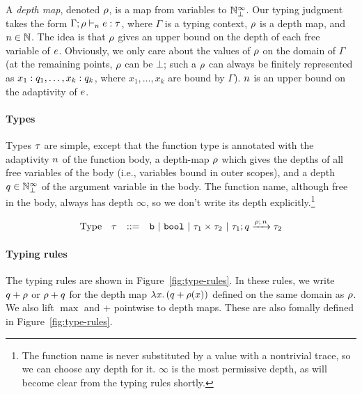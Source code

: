 \documentclass[a4paper,11pt]{article}
\theoremstyle{definition}
\begin{document}
A \emph{depth map}, denoted $\rho$, is a map from variables to
$\mathbb{N}_{\bot}^\infty$.
%
%
Our typing judgment takes the form $\Gamma; \rho \vdash_{n}
e: \tau$, where $\Gamma$ is a typing context, $\rho$ is a depth
map, and $n \in \mathbb{N}$. The idea is that $\rho$ gives an upper
bound on the depth of each free variable of $e$. Obviously, we
only care about the values of $\rho$ on the domain of $\Gamma$ (at
the remaining points, $\rho$ can be $\bot$; such a $\rho$ can always
be finitely represented as $x_1: q_1, \ldots, x_k: q_k$,
where $x_1,\ldots,x_k$ are bound by $\Gamma$). $n$ is an upper
bound on the adaptivity of $e$.

\paragraph{Types}
Types $\tau$ are simple, except that the function type is annotated
with the adaptivity $n$ of the function body, a depth-map $\rho$
which gives the depths of all free variables of the body (i.e.,
variables bound in outer scopes), and a depth $q \in \mathbb{N}_{\bot}^\infty$ of
the argument variable in the body. The function name, although free in
the body, always has depth $\infty$, so we don't write its depth
explicitly.\footnote{The function name is never substituted by a value
  with a nontrivial trace, so we can choose any depth for it. $\infty$
  is the most permissive depth, as will become clear from the typing
  rules shortly.}

\[
\begin{array}{llll}
  \mbox{Type} & \tau & ::= & \mathtt{b} ~|~ \mathtt{bool} ~|~ \tau_1 \times
  \tau_2 ~|~ \tau_1; q \xrightarrow{\rho; \, n} \tau_2
\end{array}
\]


\paragraph{Typing rules}
The typing rules are shown in Figure~\ref{fig:type-rules}. In these
rules, we write $q + \rho$ or $\rho + q$ for the depth
map $\lambda x.\, (q + \rho(x))$ defined on the same domain as
$\rho$. We also lift $\max$ and $+$ pointwise to depth maps.
These are also fomally defined in Figure~\ref{fig:type-rules}.
\end{document}
